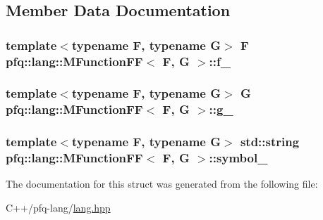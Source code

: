 \subsection{Member Data Documentation}
\hypertarget{structpfq_1_1lang_1_1MFunctionFF_afe1a6e09912dbc72b448abb8934c2b6b}{
\subsubsection[{f\+\_\+}]{\setlength{\rightskip}{0pt plus 5cm}template$<$typename F, typename G$>$ F {\bf pfq\+::lang\+::\+M\+Function\+F\+F}$<$ F, G $>$\+::f\+\_\+}}\label{structpfq_1_1lang_1_1MFunctionFF_afe1a6e09912dbc72b448abb8934c2b6b}
\hypertarget{structpfq_1_1lang_1_1MFunctionFF_ad95a0298c58403135e705e01ac72523b}{
\subsubsection[{g\+\_\+}]{\setlength{\rightskip}{0pt plus 5cm}template$<$typename F, typename G$>$ G {\bf pfq\+::lang\+::\+M\+Function\+F\+F}$<$ F, G $>$\+::g\+\_\+}}\label{structpfq_1_1lang_1_1MFunctionFF_ad95a0298c58403135e705e01ac72523b}
\hypertarget{structpfq_1_1lang_1_1MFunctionFF_a091ae27d7c96a42a64a3d042b9915c96}{
\subsubsection[{symbol\+\_\+}]{\setlength{\rightskip}{0pt plus 5cm}template$<$typename F, typename G$>$ std\+::string {\bf pfq\+::lang\+::\+M\+Function\+F\+F}$<$ F, G $>$\+::symbol\+\_\+}}\label{structpfq_1_1lang_1_1MFunctionFF_a091ae27d7c96a42a64a3d042b9915c96}


The documentation for this struct was generated from the following file\+:\begin{DoxyCompactItemize}
\item 
C++/pfq-\/lang/\hyperlink{lang_8hpp}{lang.\+hpp}\end{DoxyCompactItemize}
